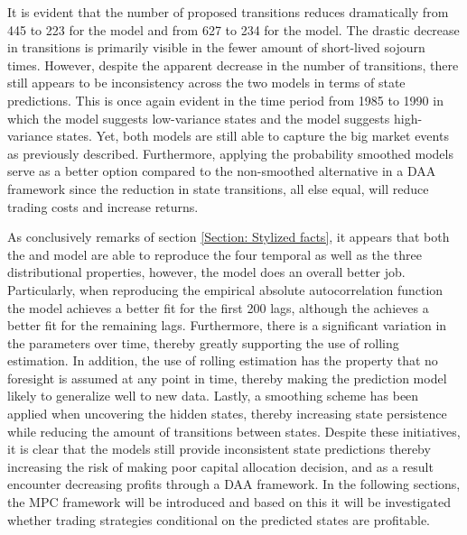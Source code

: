 It is evident that the number of proposed transitions reduces dramatically from 445 to 223 for the \mle model and from 627 to 234 for the \jump model. The drastic decrease in transitions is primarily visible in the fewer amount of short-lived sojourn times. However, despite the apparent decrease in the number of transitions, there still appears to be inconsistency across the two models in terms of state predictions. This is once again evident in the time period from 1985 to 1990 in which the \mle model suggests low-variance states and the \jump model suggests high-variance states. Yet, both models are still able to capture the big market events as previously described. Furthermore, applying the probability smoothed models serve as a better option compared to the non-smoothed alternative in a DAA framework since the reduction in state transitions, all else equal, will reduce trading costs and increase returns. 

As conclusively remarks of section \ref{Section: Stylized facts}, it appears that both the \mle and \jump model are able to reproduce the four temporal as well as the three distributional properties, however, the \jump model does an overall better job. Particularly, when reproducing the empirical absolute autocorrelation function the \jump model achieves a better fit for the first 200 lags, although the \mle achieves a better fit for the remaining lags. Furthermore, there is a significant variation in the parameters over time, thereby greatly supporting the use of rolling estimation. In addition, the use of rolling estimation has the property that no foresight is assumed at any point in time, thereby making the prediction model likely to generalize well to new data. Lastly, a smoothing scheme has been applied when uncovering the hidden states, thereby increasing state persistence while reducing the amount of transitions between states. Despite these initiatives, it is clear that the models still provide inconsistent state predictions thereby increasing the risk of making poor capital allocation decision, and as a result encounter decreasing profits through a DAA framework. In the following sections, the MPC framework will be introduced and based on this it will be investigated whether trading strategies conditional on the predicted states are profitable.
